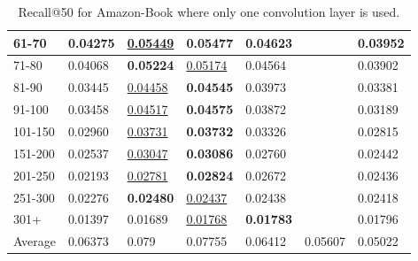 \begin{table*}[]
\begin{tabular}{|l|l|l|l|l|l|l|}
        61-70       & 0.04275                        & \underline{0.05449}            & \textbf{0.05477}               & 0.04623                        &                                & 0.03952                        \\ \hline
        71-80       & 0.04068                        & \textbf{0.05224}               & \underline{0.05174}            & 0.04564                        &                                & 0.03902                        \\ \hline
        81-90       & 0.03445                        & \underline{0.04458}            & \textbf{0.04545}               & 0.03973                        &                                & 0.03381                        \\ \hline
        91-100      & 0.03458                        & \underline{0.04517}            & \textbf{0.04575}               & 0.03872                        &                                & 0.03189                        \\ \hline
        101-150     & 0.02960                        & \underline{0.03731}            & \textbf{0.03732}               & 0.03326                        &                                & 0.02815                        \\ \hline
        151-200     & 0.02537                        & \underline{0.03047}            & \textbf{0.03086}               & 0.02760                        &                                & 0.02442                        \\ \hline
        201-250     & 0.02193                        & \underline{0.02781}            & \textbf{0.02824}               & 0.02672                        &                                & 0.02436                        \\ \hline
        251-300     & 0.02276                        & \textbf{0.02480}               & \underline{0.02437}            & 0.02438                        &                                & 0.02418                        \\ \hline
        301+        & 0.01397                        & 0.01689                        & \underline{0.01768}            & \textbf{0.01783}               &                                & 0.01796                        \\ \hline
        Average     & 0.06373                        & 0.079                          & 0.07755                        & 0.06412                        & 0.05607                        & 0.05022                        \\ \hline
    \end{tabular}
    \caption{Recall@50 for Amazon-Book where only one convolution layer is used.}
\end{table*}

